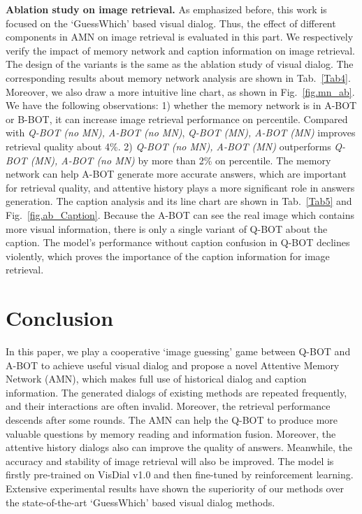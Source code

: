 \documentclass[review]{elsarticle}
\begin{document}
	
	\textbf{Ablation study on image retrieval.} 
	As emphasized before, this work is focused on the `GuessWhich' based visual dialog. Thus, the effect of different components in AMN on image retrieval is evaluated in this part. 
	We respectively verify the impact of memory network and caption information on image retrieval. 
	The design of the variants is the same as the ablation study of visual dialog. The corresponding results about memory network analysis are shown in Tab.~\ref{Tab4}. 
	Moreover, we also draw a more intuitive line chart, as shown in Fig.~\ref{fig.mn_ab}.  
	We have the following observations: 1) whether the memory network is in A-BOT or B-BOT, it can increase image retrieval performance on percentile. Compared with \emph{Q-BOT (no MN), A-BOT (no MN)}, \emph{Q-BOT (MN), A-BOT (MN)} improves retrieval quality about 4\%.
	2) \emph{Q-BOT (no MN), A-BOT (MN)} outperforms \emph{Q-BOT (MN), A-BOT (no MN)} by more than 2\% on percentile. The memory network can help A-BOT generate more accurate answers, which are important for retrieval quality, and attentive history plays a more significant role in answers generation. 
	The caption analysis and its line chart are shown in Tab.~\ref{Tab5} and Fig.~\ref{fig.ab_Caption}. 
	Because the A-BOT can see the real image which contains more visual information, there is only a single variant of Q-BOT about the caption. 
	The model's performance without caption confusion in Q-BOT declines violently, which proves the importance of the caption information for image retrieval. 
	

	\section{Conclusion}
	In this paper, we play a cooperative `image guessing' game between Q-BOT and A-BOT to achieve useful visual dialog and propose a novel Attentive Memory Network (AMN), which makes full use of historical dialog and caption information.
	The generated dialogs of existing methods are repeated frequently, and their interactions are often invalid. Moreover, the retrieval performance descends after some rounds. 
	The AMN can help the Q-BOT to produce more valuable questions by memory reading and information fusion. Moreover, the attentive history dialogs also can improve the quality of answers. Meanwhile, the accuracy and stability of image retrieval will also be improved. The model is firstly pre-trained on VisDial v1.0 and then fine-tuned by reinforcement learning. Extensive experimental results have shown the superiority of our methods over the state-of-the-art `GuessWhich' based visual dialog methods.
	

	
\end{document}
